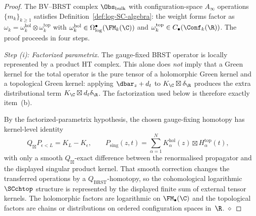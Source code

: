 \begin{proof}
The BV--BRST complex $\Obs_{\mathrm{bulk}}$ with configuration-space $A_\infty$ operations $\{m_k\}_{k \ge 1}$ satisfies Definition~\ref{def:log-SC-algebra}: the weight forms factor as $\omega_k = \omega_k^{\mathrm{hol}} \otimes \omega_k^{\mathrm{top}}$ with $\omega_k^{\mathrm{hol}} \in \Omega^\bullet_{\log}(\FM_k(\C))$ and $\omega_k^{\mathrm{top}} \in C_\bullet(\Conf_k(\R))$. The proof proceeds in four steps.

\medskip
\emph{Step (i): Factorized parametrix.}
The gauge-fixed BRST operator is locally represented by a product
HT complex. This alone does \emph{not} imply that a Green kernel for
the total operator is the pure tensor of a holomorphic Green kernel
and a topological Green kernel: applying
$\dbar_z+d_t$ to $K_\C\boxtimes\delta_\R$ produces the extra
distributional term $K_\C\boxtimes d_t\delta_\R$. The factorization
used below is therefore exactly item~\textup{(b)}.

By the factorized-parametrix hypothesis, the chosen gauge-fixing
homotopy has kernel-level identity
\[
 Q_{\boxtimes}P_{\epsilon<L}=K_L-K_\epsilon,\qquad
 P_{\mathrm{sing}}(z,t)=\sum_{\alpha=1}^{N}
 K_\alpha^{\mathrm{hol}}(z)\boxtimes H_\alpha^{\mathrm{top}}(t),
\]
with only a smooth $Q_{\boxtimes}$-exact difference between the
renormalised propagator and the displayed singular product kernel. That
smooth correction changes the transferred operations by a
$Q_{\mathrm{BRST}}$-homotopy, so the cohomological logarithmic
$\SCchtop$ structure is represented by the displayed finite sum of
external tensor kernels. The
holomorphic factors are logarithmic on $\FM_\bullet(\C)$ and the
topological factors are chains or distributions on ordered
configuration spaces in~$\R$. \hfill$\diamond$


\end{proof}
